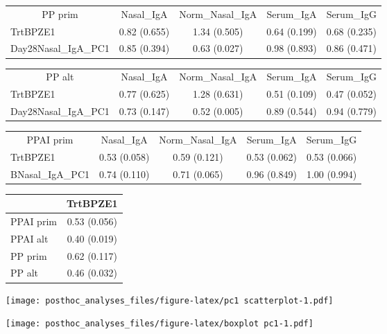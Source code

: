 \documentclass[
]{article}
\begin{document}
\begin{tabular}{>{}l|>{}c|>{}c|>{}c|c}
\hline
\multicolumn{1}{c|}{PP prim} & \multicolumn{1}{c|}{Nasal\_IgA} & \multicolumn{1}{c|}{Norm\_Nasal\_IgA} & \multicolumn{1}{c|}{Serum\_IgA} & \multicolumn{1}{c}{Serum\_IgG} \\
\cline{1-1} \cline{2-2} \cline{3-3} \cline{4-4} \cline{5-5}
TrtBPZE1 & 0.82 (0.655) & 1.34 (0.505) & 0.64 (0.199) & 0.68 (0.235)\\
\hline
Day28Nasal\_IgA\_PC1 & 0.85 (0.394) & 0.63 (0.027) & 0.98 (0.893) & 0.86 (0.471)\\
\hline
\end{tabular}

\begin{tabular}{>{}l|>{}c|>{}c|>{}c|c}
\hline
\multicolumn{1}{c|}{PP alt} & \multicolumn{1}{c|}{Nasal\_IgA} & \multicolumn{1}{c|}{Norm\_Nasal\_IgA} & \multicolumn{1}{c|}{Serum\_IgA} & \multicolumn{1}{c}{Serum\_IgG} \\
\cline{1-1} \cline{2-2} \cline{3-3} \cline{4-4} \cline{5-5}
TrtBPZE1 & 0.77 (0.625) & 1.28 (0.631) & 0.51 (0.109) & 0.47 (0.052)\\
\hline
Day28Nasal\_IgA\_PC1 & 0.73 (0.147) & 0.52 (0.005) & 0.89 (0.544) & 0.94 (0.779)\\
\hline
\end{tabular}

\begin{tabular}{>{}l|>{}c|>{}c|>{}c|c}
\hline
\multicolumn{1}{c|}{PPAI prim} & \multicolumn{1}{c|}{Nasal\_IgA} & \multicolumn{1}{c|}{Norm\_Nasal\_IgA} & \multicolumn{1}{c|}{Serum\_IgA} & \multicolumn{1}{c}{Serum\_IgG} \\
\cline{1-1} \cline{2-2} \cline{3-3} \cline{4-4} \cline{5-5}
TrtBPZE1 & 0.53 (0.058) & 0.59 (0.121) & 0.53 (0.062) & 0.53 (0.066)\\
\hline
BNasal\_IgA\_PC1 & 0.74 (0.110) & 0.71 (0.065) & 0.96 (0.849) & 1.00 (0.994)\\
\hline
\end{tabular}

\begin{tabular}{>{}l|c}
\hline
  & TrtBPZE1\\
\hline
PPAI prim & 0.53 (0.056)\\
\hline
PPAI alt & 0.40 (0.019)\\
\hline
PP prim & 0.62 (0.117)\\
\hline
PP alt & 0.46 (0.032)\\
\hline
\end{tabular}

\texttt{[image: posthoc\_analyses\_files/figure-latex/pc1 scatterplot-1.pdf]}

\texttt{[image: posthoc\_analyses\_files/figure-latex/boxplot pc1-1.pdf]}
\end{document}
